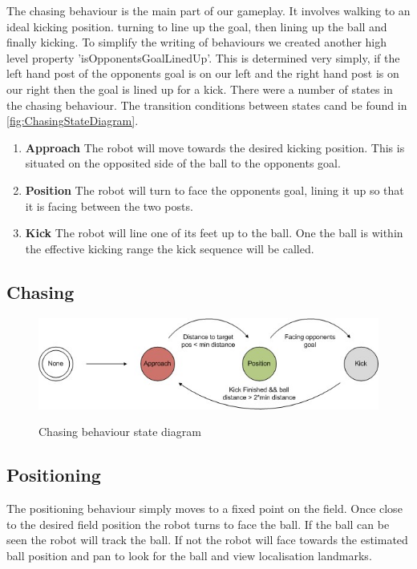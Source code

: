 The chasing behaviour is the main part of our gameplay. It involves walking to an ideal kicking position. turning to line up the goal, then lining up the ball and finally kicking. To simplify the writing of behaviours we created another high level property 'isOpponentsGoalLinedUp'. This is determined very simply, if the left hand post of the opponents goal is on our left and the right hand post is on our right then the goal is lined up for a kick. There were a number of states in the chasing behaviour. The transition conditions between states cand be found in \autoref{fig:ChasingStateDiagram}.
\begin{enumerate}
\item \textbf{Approach} The robot will move towards the desired kicking position. This is situated on the opposited side of the ball to the opponents goal.
\item \textbf{Position} The robot will turn to face the opponents goal, lining it up so that it is facing between the two posts.
\item \textbf{Kick} The robot will line one of its feet up to the ball. One the ball is within the effective kicking range the kick sequence will be called.
\end{enumerate}

\subsection{Chasing}
\begin{figure}[!h]
\begin{center}
   \leavevmode
    \scalebox{0.8} {\includegraphics{figs/FieldPlayerChasingStates.jpg} }
    \caption{Chasing behaviour state diagram}
    \label{fig:ChasingStateDiagram}
\end{center}
\end{figure}

\subsection{Positioning}
The positioning behaviour simply moves to a fixed point on the field. Once close to the desired field position the robot turns to face the ball. If the ball can be seen the robot will track the ball. If not the robot will face towards the estimated ball position and pan to look for the ball and view localisation landmarks.
